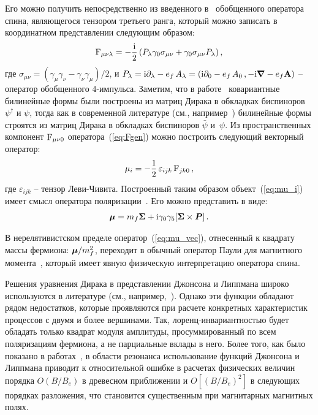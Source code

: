 Его можно получить непосредственно 
из введенного в~\cite{Sokolov:1968} обобщенного оператора спина, 
являющегося тензором третьего ранга, который можно записать в координатном представлении следующим образом:
%
\begin{eqnarray}
	{\rm F}_{\mu \nu \lambda} = - \frac{\mathrm{i}}{2} \left( P_\lambda \gamma_0 \sigma_{\mu \nu} 
	+ \gamma_0 \sigma_{\mu \nu} P_\lambda \right),
	\label{eq:Fgen}
\end{eqnarray}
%
\noindent где $\sigma_{\mu \nu} = (\gamma_\mu \gamma_\nu - \gamma_\nu \gamma_\mu)/2$, и  
$P_\lambda = \mathrm{i} \partial_\lambda - e_f \, A_\lambda = \left( \mathrm{i} \partial_0 - e_f \, A_0 \,, 
- \mathrm{i} {\boldsymbol \nabla} - e_f {\bf A} \right)$ -- оператор обобщенного 4-импульса. 
Заметим, что в работе~\cite{Sokolov:1968} ковариантные билинейные формы были построены из матриц Дирака в обкладках  биспиноров 
$\psi^{\dagger}$ и $\psi$, тогда как в современной литературе (см., например~\cite{Peskin:1995}) билинейные формы строятся из матриц 
Дирака в обкладках биспиноров $\bar\psi$ и~$\psi$. Из пространственных компонент ${\rm F}_{\mu \nu 0}$ 
оператора~(\ref{eq:Fgen}) можно построить следующий векторный оператор:
%
\begin{eqnarray}
	\mu_i = - \frac{1}{2} \, \varepsilon_{ijk} \, {\rm F}_{jk0} \,, 
	\label{eq:mu_i}
\end{eqnarray}
%
где $\varepsilon_{ijk}$ -- тензор Леви-Чивита.  
Построенный таким образом объект~(\ref{eq:mu_i})  имеет смысл 
оператора поляризации~\cite{Sokolov:1968,Melrose:1983}.
Его можно представить в виде:
%
\begin{eqnarray}
	{\boldsymbol\mu} = m_f {\boldsymbol \Sigma} + \mathrm{i} \gamma_0 \gamma_5 [{\boldsymbol \Sigma} \times {\boldsymbol P}] \, .
	\label{eq:mu_vec}
\end{eqnarray}

В нерелятивистском пределе оператор~(\ref{eq:mu_vec}), 
отнесенный к квадрату массы фермиона:  ${\boldsymbol \mu}/m_f^2$,  
переходит в обычный оператор Паули для магнитного момента~\cite{Landau:1989}, 
который имеет явную физическую интерпретацию оператора спина.

Решения уравнения Дирака в представлении Джонсона и Липпмана широко используются в литературе (см., например,~\cite{Canuto:1975,Harding:1991,Suh:1999,Gonthier:2000,Jones:2010,Melrose:2020}). Однако эти функции обладают рядом недостатков, которые проявляются при расчете конкретных характеристик процессов с двумя и более вершинами. Так, лоренц-инвариантностью будет обладать только квадрат модуля амплитуды, просуммированный по всем поляризациям фермиона, а не парциальные вклады в него. Более того, как было показано в работах~\cite{Graziani:1993,Gonthier:2014}, в области резонанса использование функций Джонсона и Липпмана приводит к относительной ошибке в расчетах физических величин порядка $O(B / B_{e})$ в древесном приближении и $O[(B / B_{e})^2]$ в следующих порядках разложения, что становится существенным при магнитарных магнитных полях.

